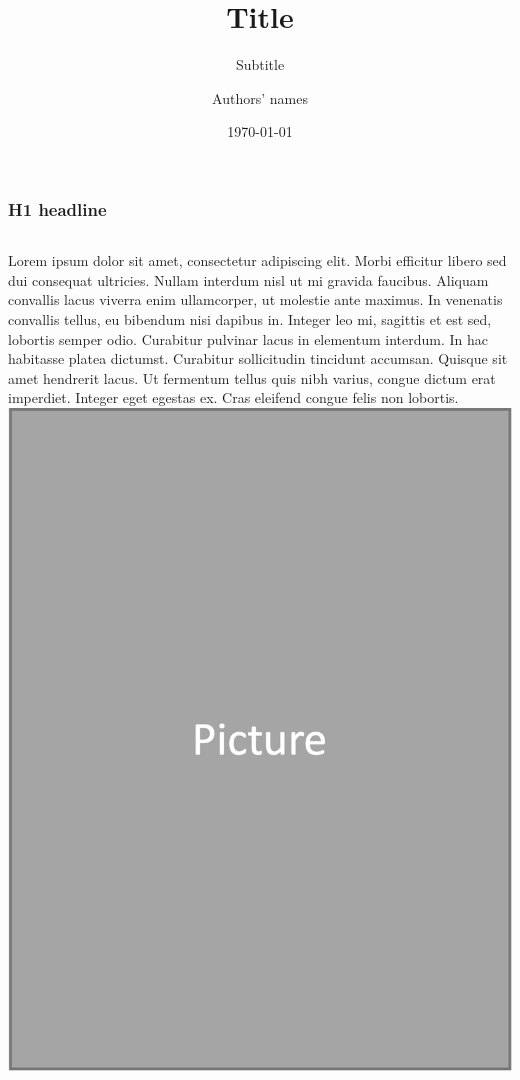 \documentclass[aspectratio=169]{beamer}
\title{Title}
\subtitle{Subtitle}
\author{Authors' names}
\date{\today}
\institute{Institute}
\begin{document}
\begin{frame}
  \maketitle
\end{frame}

\begin{frame}
  \frametitle{H1 headline}
  \begin{columns}
      \footnotesize
      Lorem ipsum dolor sit amet, consectetur adipiscing elit. Morbi efficitur libero sed dui consequat ultricies. Nullam interdum nisl ut mi gravida faucibus. Aliquam convallis lacus viverra enim ullamcorper, ut molestie ante maximus. In venenatis convallis tellus, eu bibendum nisi dapibus in. Integer leo mi, sagittis et est sed, lobortis semper odio. Curabitur pulvinar lacus in elementum interdum. In hac habitasse platea dictumst. Curabitur sollicitudin tincidunt accumsan. Quisque sit amet hendrerit lacus.  Ut fermentum tellus quis nibh varius, congue dictum erat imperdiet. Integer eget egestas ex. Cras eleifend congue felis non lobortis.
    \includegraphics[width=\textwidth]{Picture.png}
  \end{columns}
\end{frame}
\end{document}
